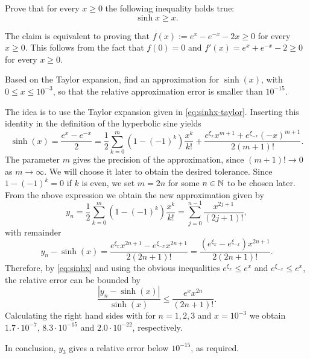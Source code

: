 \begin{problem}
\begin{subproblem}[2]
Prove that for every $x\ge 0$ the following inequality holds true:
\begin{equation}
\label{eq:sinhx}
\sinh x \ge x.
\end{equation}
  \begin{solution}
The claim is equivalent to proving that $f(x):=e^x-e^{-x}-2x\ge 0$ for every $x\ge 0$. This follows from the fact that $f(0)=0$ and $f'(x)=e^x+e^{-x}-2\ge 0$ for every $x\ge 0$.
    \end{solution}

\end{subproblem}

\begin{subproblem}[3]
  Based on the Taylor expansion, find an approximation for $\sinh(x)$, with
  $0\leq x\leq 10^{-3}$, so that the relative approximation 
  error is smaller than $10^{-15}$.
  \begin{solution}
The idea is to use the Taylor expansion given in \eqref{eq:sinhx-taylor}. Inserting this identity in the definition of the hyperbolic sine yields
\[
\sinh(x)=\frac{e^x-e^{-x}}{2}=\frac{1}{2}\sum_{k=0}^m (1-(-1)^k) \frac{x^k}{k!} + \frac{e^{\xi_x} x^{m+1}+e^{\xi_{-x}} (-x)^{m+1}}{2(m+1)!}.
\]
The parameter $m$ gives the precision of the approximation, since $(m+1)!\to 0$ as $m\to \infty$. We will choose it later to obtain the desired tolerance. Since $1-(-1)^k=0$ if $k$ is even, we set $m=2n$ for some $n\in\mathbb{N}$ to be chosen later. From the above expression we obtain the new approximation given by
\[
y_n=\frac{1}{2}\sum_{k=0}^m (1-(-1)^k) \frac{x^k}{k!} =\sum_{j=0}^{n-1}  \frac{x^{2j+1}}{(2j+1)!},
\]
with remainder
\[
y_n-\sinh(x)=\frac{e^{\xi_x} x^{2n+1}-e^{\xi_{-x}} x^{2n+1}}{2(2n+1)!}=\frac{(e^{\xi_x} -e^{\xi_{-x}} )x^{2n+1}}{2(2n+1)!}.
\]
Therefore, by \eqref{eq:sinhx} and using the obvious inequalities $e^{\xi_x}\le e^x$ and $e^{\xi_{-x}}\le e^x$, the relative error can be bounded by
\[
\frac{|y_n-\sinh(x)|}{\sinh(x)}\le\frac{e^x x^{2n}}{(2n+1)!}.
\]
Calculating the right hand sides with \Matlab{} for $n=1,2,3$ and  $x=10^{-3}$ we obtain $1.7\cdot 10^{-7}$, $8.3\cdot 10^{-15}$ and $2.0\cdot 10^{-22}$, respectively.

In conclusion, $y_3$ gives a relative error below $10^{-15}$, as required.
    \end{solution}

\end{subproblem}


\end{problem}
